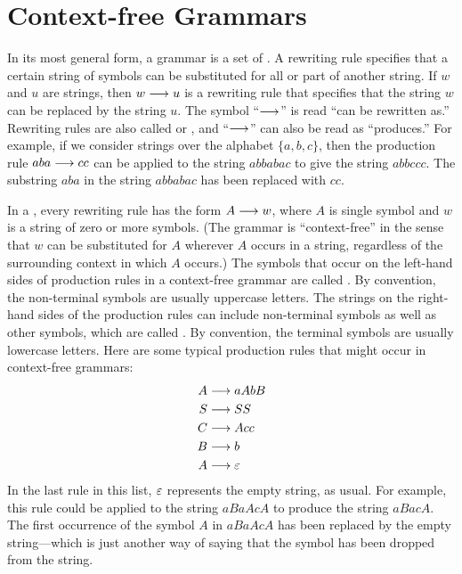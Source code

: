 \section{Context-free Grammars}\label{S-grammars-1}

In its most general form, a grammar is a set of .  A rewriting rule specifies that a certain string of symbols can
be substituted for all or part of another string.  If $w$ and $u$ are
strings, then $w\longrightarrow u$ is a rewriting rule that specifies that
the string $w$ can be replaced by the string $u$.  The symbol ``$\longrightarrow$''
is read ``can be rewritten as.''  Rewriting rules are also called
 or , and
``$\longrightarrow$'' can also be read as ``produces.''  For example,
if we consider strings over the alphabet $\{a,b,c\}$, then
the production rule $aba\longrightarrow cc$ can be applied to the
string $abbabac$ to give the string $abbccc$.  The substring $aba$
in the string $abbabac$ has been replaced with $cc$.

In a , every rewriting rule has the
form $A\longrightarrow w$, where $A$ is single symbol and $w$ is a string
of zero or more symbols.  (The grammar is ``context-free'' in the
sense that $w$ can be substituted for $A$ wherever $A$ occurs in a string,
regardless of the surrounding context in which $A$ occurs.)
The symbols that occur on the left-hand
sides of production rules in a context-free grammar
are called .
By convention, the non-terminal symbols are usually  uppercase letters.
The strings on the right-hand sides of the production rules can
include non-terminal symbols as well as other symbols, which are
called .  By convention, the
terminal symbols are usually lowercase letters.  Here are some
typical production rules that might occur in context-free grammars:
\begin{align*}
   A&\longrightarrow aAbB\\
   S&\longrightarrow SS\\
   C&\longrightarrow Acc\\
   B&\longrightarrow b\\
   A&\longrightarrow\varepsilon
\end{align*}
In the last rule in this list, $\varepsilon$ represents the empty string,
as usual.  For example, this rule could be applied to the string
$aBaAcA$ to produce the string $aBacA$.  The first occurrence of
the symbol $A$ in $aBaAcA$ has been replaced by the empty string---which
is just another way of saying that the symbol has been dropped from the string.

